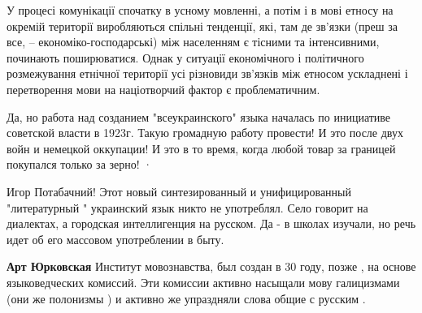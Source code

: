 \begin{itemize}
\begin{itemize}
\begin{itemize}
У процесі комунікації спочатку в усному мовленні, а потім і в мові етносу на
окремій території виробляються спільні тенденції, які, там де зв’язки (преш за
все, – економіко-господарські) між населенням є тісними та інтенсивними,
починають поширюватися. Однак у ситуації економічного і політичного
розмежування етнічної території усі різновиди зв’язків між етносом ускладнені і
перетворення мови на націотворчий фактор є проблематичним.

\end{itemize}

 

Да, но работа над созданием "всеукраинского" языка началась по инициативе
советской власти в 1923г. Такую громадную работу провести! И это после двух войн
и немецкой оккупации! И это в то время, когда любой товар за границей покупался
только за зерно!  · 


 

Игор Потабачний! Этот новый синтезированный и унифицированный "литературный "
украинский язык никто не употреблял. Село говорит на диалектах, а городская
интеллигенция на русском. Да - в школах изучали, но речь идет об его массовом
употреблении в быту.

\begin{itemize}
 
\textbf{Арт Юрковская} Институт мовознавства, был создан в 30 году, позже , на
основе языковедческих комиссий. Эти комиссии активно насыщали мову галицизмами
(они же полонизмы ) и активно же упраздняли слова общие с русским .
\end{itemize}

 

\end{itemize}
\end{itemize}
